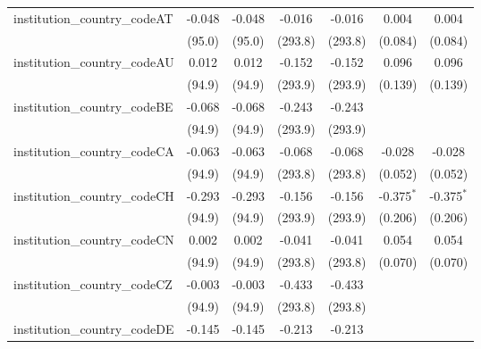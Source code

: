 \begin{tabular}{lcccccc}
   institution\_country\_codeAT          & -0.048        & -0.048        & -0.016        & -0.016        & 0.004         & 0.004\\   
                                         & (95.0)        & (95.0)        & (293.8)       & (293.8)       & (0.084)       & (0.084)\\   
   institution\_country\_codeAU          & 0.012         & 0.012         & -0.152        & -0.152        & 0.096         & 0.096\\   
                                         & (94.9)        & (94.9)        & (293.9)       & (293.9)       & (0.139)       & (0.139)\\   
   institution\_country\_codeBE          & -0.068        & -0.068        & -0.243        & -0.243        &               &   \\   
                                         & (94.9)        & (94.9)        & (293.9)       & (293.9)       &               &   \\   
   institution\_country\_codeCA          & -0.063        & -0.063        & -0.068        & -0.068        & -0.028        & -0.028\\   
                                         & (94.9)        & (94.9)        & (293.8)       & (293.8)       & (0.052)       & (0.052)\\   
   institution\_country\_codeCH          & -0.293        & -0.293        & -0.156        & -0.156        & -0.375$^{*}$  & -0.375$^{*}$\\   
                                         & (94.9)        & (94.9)        & (293.9)       & (293.9)       & (0.206)       & (0.206)\\   
   institution\_country\_codeCN          & 0.002         & 0.002         & -0.041        & -0.041        & 0.054         & 0.054\\   
                                         & (94.9)        & (94.9)        & (293.8)       & (293.8)       & (0.070)       & (0.070)\\   
   institution\_country\_codeCZ          & -0.003        & -0.003        & -0.433        & -0.433        &               &   \\   
                                         & (94.9)        & (94.9)        & (293.8)       & (293.8)       &               &   \\   
   institution\_country\_codeDE          & -0.145        & -0.145        & -0.213        & -0.213        &               &   \\   

\end{tabular}
